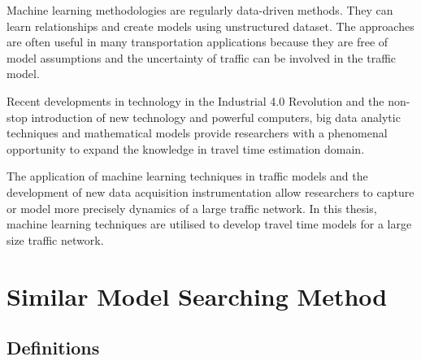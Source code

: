 \documentclass[journal]{IEEEtran}
\begin{document}
Machine learning methodologies are regularly data-driven methods. They can learn relationships and create models using unstructured dataset. The approaches are often useful in many transportation applications because they are free of model assumptions and the uncertainty of traffic can be involved in the traffic model.

Recent developments in technology in the Industrial 4.0 Revolution and the non-stop introduction of new technology and powerful computers, big data analytic techniques and mathematical models provide researchers with a phenomenal opportunity to expand the knowledge in travel time estimation domain. 

The application of machine learning techniques in traffic models and the development of new data acquisition  instrumentation allow researchers to capture or model more precisely dynamics of a large traffic network. In this thesis, machine learning techniques are utilised to develop travel time models for a large size traffic network.


\section{Similar Model Searching Method} 
\label{sec:sms}
\subsection{Definitions}
\end{document}

